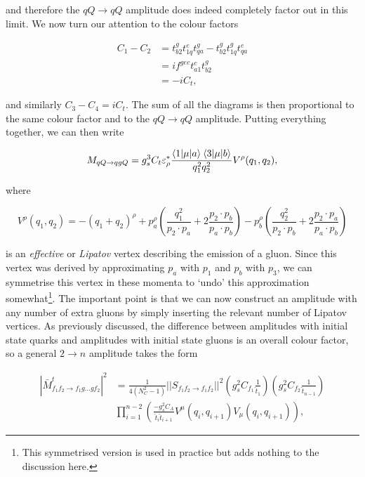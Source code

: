 and therefore the $qQ \to qQ$ amplitude does indeed completely factor out in this limit. We now turn our attention to the colour factors

\begin{equation}
\begin{split}
C_1 - C_2 &= t^g_{b2} t^e_{1q} t^g_{qa} - t^g_{b2} t^g_{1q} t^e_{qa} \\
&=  if^{gec}t^c_{a1}t^g_{b2} \\
&= -i C_t,
\end{split}
\end{equation}

and similarly $C_3 - C_4 = iC_t$. The sum of all the diagrams is then proportional to the same colour factor and to the $qQ \to qQ$ amplitude. Putting everything together, we can then write

\begin{equation}
M_{qQ \to qgQ} = g_s^3 C_t \varepsilon^*_\rho \frac{\mathinner{\langle1\vert\mu\vert a\rangle}_{} \mathinner{\langle3\vert\mu\vert b\rangle}_{}}{q_1^2 q_2^2} V^\rho (q_1, q_2),
\end{equation}

where

\begin{equation}
V^\rho(q_1, q_2) = -(q_1 + q_2)^\rho + p_a^\rho \left( \frac{q_1^2}{p_2 \cdot p_a} + 2 \frac{p_2 \cdot p_b}{p_a \cdot p_b}\right) -  p_b^\rho \left( \frac{q_2^2}{p_2 \cdot p_b} + 2 \frac{p_2 \cdot p_a}{p_a \cdot p_b}\right)
\end{equation}

is an \emph{effective} or \emph{Lipatov} vertex describing the emission of a gluon. Since this vertex was derived by approximating $p_a$ with $p_1$ and $p_b$ with $p_3$, we can symmetrise this vertex in these momenta to `undo' this approximation somewhat\footnote{This symmetrised version is used in practice but adds nothing to the discussion here.}. The important point is that we can now construct an amplitude with any number of extra gluons by simply inserting the relevant number of Lipatov vertices. As previously discussed, the difference between amplitudes with initial state quarks and amplitudes with initial state gluons is an overall colour factor, so a general $2 \to n$ amplitude takes the form

\begin{equation}
\begin{split}
|\bar{M}^t_{f_1 f_2 \to f_1 g ... g f_2}|^2 &= \frac{1}{4 (N_C^2 - 1)} ||S_{f_1 f_2 \to f_1 f_2} ||^2 \left(g_s^2 C_{f_1} \frac{1}{\hat{t}_1} \right) \left(g_s^2 C_{f_2} \frac{1}{\hat{t}_{n-1}} \right) \\
& \prod_{i=1}^{n-2} \left(\frac{-g_s^2 C_{A}}{\hat{t}_i \hat{t}_{i+1}} V^\mu (q_i, q_{i+1}) V_\mu (q_i, q_{i+1})  \right),
 \end{split}
\end{equation}

